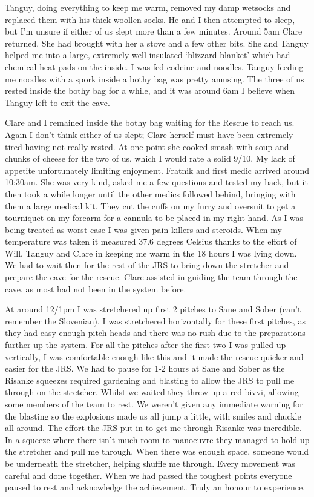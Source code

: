     Tanguy, doing everything to keep me warm, removed my damp wetsocks and replaced them with his thick woollen socks. He and I then attempted to sleep, but I’m unsure if either of us slept more than a few minutes.
    Around 5am Clare returned. She had brought with her a stove and a few other bits. She and Tanguy helped me into a large, extremely well insulated ‘blizzard blanket’ which had chemical heat pads on the inside. I was fed codeine and noodles. Tanguy feeding me noodles with a spork inside a bothy bag was pretty amusing. The three of us rested inside the bothy bag for a while, and it was around 6am I believe when Tanguy left to exit the cave.

    Clare and I remained inside the bothy bag waiting for the Rescue to reach us. Again I don’t think either of us slept; Clare herself must have been extremely tired having not really rested. At one point she cooked smash with soup and chunks of cheese for the two of us, which I would rate a solid 9/10. My lack of appetite unfortunately limiting enjoyment.
    Fratnik and first medic arrived around 10:30am. She was very kind, asked me a few questions and tested my back, but it then took a while longer until the other medics followed behind, bringing with them a large medical kit. They cut the cuffs on my furry and oversuit to get a tourniquet on my forearm for a cannula to be placed in my right hand. As I was being treated as worst case I was given pain killers and steroids. When my temperature was taken it measured 37.6 degrees Celsius thanks to the effort of Will, Tanguy and Clare in keeping me warm in the 18 hours I was lying down.
    We had to wait then for the rest of the JRS to bring down the stretcher and prepare the cave for the rescue. Clare assisted in guiding the team through the cave, as most had not been in the system before.

    At around 12/1pm I was stretchered up first 2 pitches to Sane and Sober (can’t remember the Slovenian). I was stretchered horizontally for these first pitches, as they had easy enough pitch heads and there was no rush due to the preparations further up the system. For all the pitches after the first two I was pulled up vertically, I was comfortable enough like this and it made the rescue quicker and easier for the JRS. We had to pause for 1-2 hours at Sane and Sober as the Risanke squeezes required gardening and blasting to allow the JRS to pull me through on the stretcher. Whilst we waited they threw up a red bivvi, allowing some members of the team to rest. We weren’t given any immediate warning for the blasting so the explosions made us all jump a little, with smiles and chuckle all around.
    The effort the JRS put in to get me through Risanke was incredible. In a squeeze where there isn’t much room to manoeuvre they managed to hold up the stretcher and pull me through. When there was enough space, someone would be underneath the stretcher, helping shuffle me through. Every movement was careful and done together. When we had passed the toughest points everyone paused to rest and acknowledge the achievement. Truly an honour to experience.

